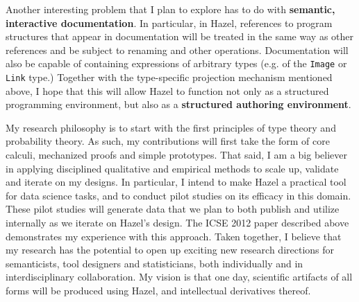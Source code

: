 \documentclass[9pt]{extarticle}
\let\li\lstinline
\begin{document}
Another interesting problem that I plan to explore has to do with \textbf{semantic, interactive documentation}. In particular, in Hazel, references to program structures that appear in documentation will be treated in the same way as other references and be subject to renaming and other operations. Documentation will also be capable of containing expressions of arbitrary types (e.g. of the \li{Image} or \li{Link} type.) Together with the type-specific projection mechanism mentioned above, I hope that this will allow Hazel to function not only as a structured programming environment, but also as a \textbf{structured authoring environment}.  %



My research philosophy is to start with the first principles of type theory and probability theory. As such, my contributions will first take the form of core calculi, mechanized proofs and simple prototypes. That said, I am a big believer in applying disciplined qualitative and empirical methods to scale up, validate and iterate on my designs. In particular, I intend to make Hazel a practical tool for data science tasks, and to conduct pilot studies on its efficacy in this domain. These pilot studies will generate data that we plan to both publish and utilize internally as we iterate on Hazel's design. The ICSE 2012 paper described above demonstrates my experience with this approach. Taken together, I believe that my research has the potential to open up exciting new research directions for semanticists, tool designers and statisticians, both individually and in interdisciplinary collaboration. My vision is that one day, scientific artifacts of all forms will be produced using Hazel, and intellectual derivatives thereof.


 
\end{document}
